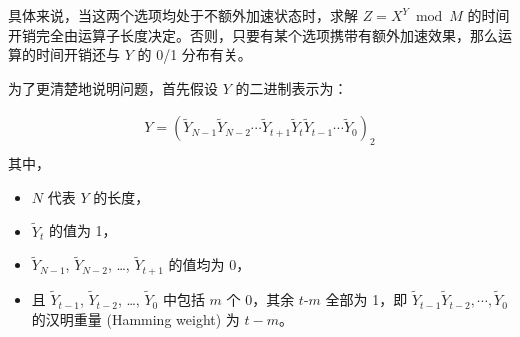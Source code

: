 \documentclass[main\_\_CN.tex]{subfiles}
\begin{document}
具体来说，当这两个选项均处于不额外加速状态时，求解 \begin{math}Z = X^{Y} \bmod M\end{math} 的时间开销完全由运算子长度决定。否则，只要有某个选项携带有额外加速效果，那么运算的时间开销还与 \begin{math}Y\end{math} 的 0/1 分布有关。

为了更清楚地说明问题，首先假设 \begin{math}Y \end{math} 的二进制表示为：

\begin{gather*}
Y = ( \widetilde{Y}_{N-1} \widetilde{Y}_{N-2} \cdots \widetilde{Y}_{t+1} \widetilde{Y}_{t} \widetilde{Y}_{t-1} \cdots \widetilde{Y}_{0} )_{2} \\
\end{gather*}
其中，
\begin{itemize}
    \item \begin{math} N \end{math} 代表 \begin{math}Y \end{math} 的长度，
    \item \begin{math}\widetilde{Y}_{t}\end{math} 的值为 1，
    \item \begin{math}\widetilde{Y}_{N-1}\end{math}, \begin{math}\widetilde{Y}_{N-2}\end{math}, \dots, \begin{math}\widetilde{Y}_{t+1}\end{math} 的值均为 0，
    \item 且 \begin{math}\widetilde{Y}_{t-1}\end{math}, \begin{math}\widetilde{Y}_{t-2}\end{math}, \dots, \begin{math}\widetilde{Y}_{0}\end{math} 中包括 \begin{math}m\end{math} 个 0，其余 \begin{math}t\end{math}-\begin{math}m\end{math} 全部为 1，即 \begin{math}\widetilde{Y}_{t-1} \widetilde{Y}_{t-2}, \cdots, \widetilde{Y}_{0}\end{math} 的汉明重量 (Hamming weight) 为 \begin{math}t -m\end{math}。
\end{itemize}
\end{document}
